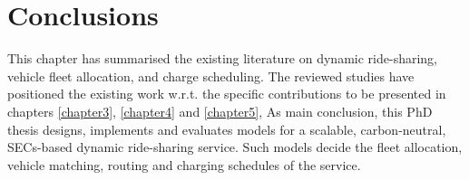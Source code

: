         

        







\section{Conclusions}
This chapter has summarised the existing literature on dynamic ride-sharing, vehicle fleet allocation, and charge scheduling. The reviewed studies have positioned the existing work w.r.t. the specific contributions to be presented in chapters \ref{chapter3}, \ref{chapter4} and \ref{chapter5}, As main conclusion, this PhD thesis designs, implements and evaluates models for a scalable, carbon-neutral, SECs-based dynamic ride-sharing service. Such models decide the fleet allocation, vehicle matching, routing and charging schedules of the service.


